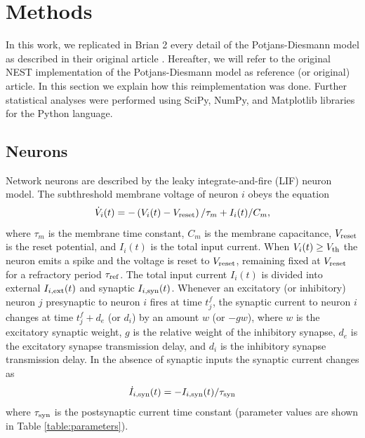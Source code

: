 \documentclass[10pt,a4paper,onecolumn]{article}
\begin{document}
\section{Methods}\label{methods}

In this work, we replicated in Brian 2 every detail of the Potjans-Diesmann model as described in their original article \cite{potjans2014}. Hereafter, we will refer to the original NEST implementation of the Potjans-Diesmann model \cite{potjans2014} as reference (or original) article.  In this section we explain how this reimplementation was done. Further statistical analyses were performed using SciPy, NumPy, and Matplotlib libraries for the Python language.
 
\subsection{Neurons}

Network neurons are described by the leaky integrate-and-fire (LIF) neuron model. The subthreshold membrane voltage of neuron $i$ obeys the equation
\begin{equation}
\label{Eq:LIF}
\dot{V}_i(t) = - \left( V_i(t) - V_{\rm reset} \right)/\tau_m + I_i(t)/C_m,
\end{equation}
where $\tau_m$ is the membrane time constant, $C_m$ is the membrane capacitance, $V_{\rm reset}$ is the reset potential, and $I_i(t)$ is the total input current. When $V_i(t) \geq V_{\rm th}$ the neuron emits a spike and the voltage is reset to $V_{\rm reset}$, remaining fixed at $V_{\rm reset}$ for a refractory period $\tau_{\rm ref}$. The total input current $I_i(t)$ is divided into external $I_{i, \rm ext}(t)$ and synaptic $I_{i, \rm syn}(t)$. Whenever an excitatory (or inhibitory) neuron $j$ presynaptic to neuron $i$ fires at time $t_{j}^{f}$, the synaptic current to neuron $i$ changes at time $t_{j}^{f}+d_e$ (or $d_i$) by an amount $w$ (or $-g w$), where $w$ is the excitatory synaptic weight, $g$ is the relative weight of the inhibitory synapse, $d_e$ is the excitatory synapse transmission delay, and $d_i$ is the inhibitory synapse transmission delay. In the absence of synaptic inputs the synaptic current changes as
\begin{equation}
\label{Eq:Isyn}
\dot{I}_{i, \rm syn}(t) = -I_{i, \rm syn}(t)/\tau_{\rm syn} 
\end{equation}
\noindent where $\tau_{\rm syn}$ is the postsynaptic current time constant (parameter values are shown in Table \ref{table:parameters}).
\end{document}

